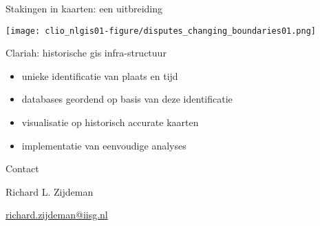 \documentclass[ignorenonframetext,]{beamer}
\makeatletter
\def\maxwidth{\ifdim\Gin@nat@width>\linewidth\linewidth\else\Gin@nat@width\fi}
\def\maxheight{\ifdim\Gin@nat@height>\textheight0.8\textheight\else\Gin@nat@height\fi}
\renewcommand{\includegraphics}[2][]{%
    \Oldincludegraphics[#1,width=\maxwidth,height=\maxheight,keepaspectratio]{#2}}
\makeatother
\begin{document}
\begin{frame}{Stakingen in kaarten: een uitbreiding}

\texttt{[image: clio\_nlgis01-figure/disputes\_changing\_boundaries01.png]}

\end{frame}

\begin{frame}{Clariah: historische gis infra-structuur}

\begin{itemize}
\itemsep1pt\parskip0pt
\item
  unieke identificatie van plaats en tijd
\item
  databases geordend op basis van deze identificatie
\item
  visualisatie op historisch accurate kaarten
\item
  implementatie van eenvoudige analyses
\end{itemize}

\end{frame}

\begin{frame}{Contact}

\begin{block}{Richard L. Zijdeman}

\href{mailto:richard.zijdeman@iisg.nl}{richard.zijdeman@iisg.nl}

\end{block}

\end{frame}
\end{document}
